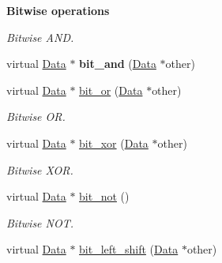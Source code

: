 \begin{Indent}{\bf Bitwise operations}\par
{\em Bitwise A\+ND. }\begin{DoxyCompactItemize}
\item 
virtual \hyperlink{classcreek_1_1_data}{Data} $\ast$ {\bfseries bit\+\_\+and} (\hyperlink{classcreek_1_1_data}{Data} $\ast$other)\hypertarget{classcreek_1_1_data_a0a9f485f6c95cf27b62b509c634a99d8}{}\label{classcreek_1_1_data_a0a9f485f6c95cf27b62b509c634a99d8}

\item 
virtual \hyperlink{classcreek_1_1_data}{Data} $\ast$ \hyperlink{classcreek_1_1_data_a576e100518c2b1644699551a851d9feb}{bit\+\_\+or} (\hyperlink{classcreek_1_1_data}{Data} $\ast$other)\hypertarget{classcreek_1_1_data_a576e100518c2b1644699551a851d9feb}{}\label{classcreek_1_1_data_a576e100518c2b1644699551a851d9feb}

\begin{DoxyCompactList}\small\item\em Bitwise OR. \end{DoxyCompactList}\item 
virtual \hyperlink{classcreek_1_1_data}{Data} $\ast$ \hyperlink{classcreek_1_1_data_a719fd3e56613dba47a2a9567252dec32}{bit\+\_\+xor} (\hyperlink{classcreek_1_1_data}{Data} $\ast$other)\hypertarget{classcreek_1_1_data_a719fd3e56613dba47a2a9567252dec32}{}\label{classcreek_1_1_data_a719fd3e56613dba47a2a9567252dec32}

\begin{DoxyCompactList}\small\item\em Bitwise X\+OR. \end{DoxyCompactList}\item 
virtual \hyperlink{classcreek_1_1_data}{Data} $\ast$ \hyperlink{classcreek_1_1_data_aed4b9b767340b341a4f746f3c10a467f}{bit\+\_\+not} ()\hypertarget{classcreek_1_1_data_aed4b9b767340b341a4f746f3c10a467f}{}\label{classcreek_1_1_data_aed4b9b767340b341a4f746f3c10a467f}

\begin{DoxyCompactList}\small\item\em Bitwise N\+OT. \end{DoxyCompactList}\item 
virtual \hyperlink{classcreek_1_1_data}{Data} $\ast$ \hyperlink{classcreek_1_1_data_a23425c8731832435a8de5d5bfa697e59}{bit\+\_\+left\+\_\+shift} (\hyperlink{classcreek_1_1_data}{Data} $\ast$other)\hypertarget{classcreek_1_1_data_a23425c8731832435a8de5d5bfa697e59}{}\label{classcreek_1_1_data_a23425c8731832435a8de5d5bfa697e59}


\end{DoxyCompactItemize}
\end{Indent}
